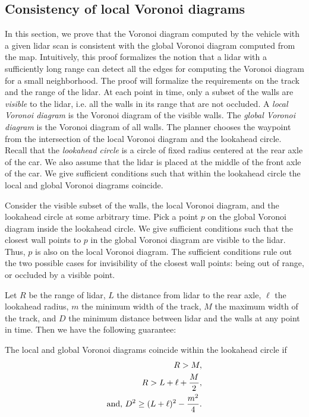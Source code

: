 \subsection{Consistency of local Voronoi diagrams}
\label{sec:localVoronoi}

In this section, we prove that the Voronoi diagram computed by the vehicle with a given lidar scan is consistent with the global Voronoi diagram computed from the map.
%
Intuitively, this proof formalizes the notion that a lidar with a sufficiently long range can detect all the edges for computing the Voronoi diagram for a small neighborhood.
%
The proof will formalize the requirements on the track and the range of the lidar.
%
At each point in time, only a subset of the walls are \emph{visible} to the lidar, i.e. all the walls in its range that are not occluded.
%
A \emph{local Voronoi diagram} is the Voronoi diagram of the visible walls.
%
The \emph{global Voronoi diagram} is the Voronoi diagram of all walls.
%
The planner chooses the waypoint from the intersection of the local Voronoi diagram and the lookahead circle.
%
Recall that the \emph{lookahead circle} is a circle of fixed radius centered at the rear axle of the car.
%
We also assume that the lidar is placed at the middle of the front axle of the car.
%
We give sufficient conditions such that within the lookahead circle the local and global Voronoi diagrams coincide.
%

Consider the visible subset of the walls, the local Voronoi diagram, and the lookahead circle at some arbitrary time.
%
Pick a point $p$ on the global Voronoi diagram inside the lookahead circle.
%
We give sufficient conditions such that the closest wall points to $p$ in the global Voronoi diagram are visible to the lidar. 
%
Thus, $p$ is also on the local Voronoi diagram.
%
The sufficient conditions rule out the two possible cases for invisibility of the closest wall points: being out of range, or occluded by a visible point.

Let $R$ be the range of lidar, 
$L$ the distance from lidar to the rear axle,
$\ell$ the lookahead radius,
$m$ the minimum width of the track,
$M$ the maximum width of the track,
and $D$ the minimum distance between lidar and the walls at any point in time.
Then we have the following guarantee:

\begin{theorem}
The local and global Voronoi diagrams coincide within the lookahead circle if
\begin{align}
    R > M, \\
    R > L + \ell + \frac{M}{2}, \label{eq:lidar-range-b} \\
    \textnormal{and,  } D^2 \geq (L+\ell)^2-\frac{m^2}{4}.\label{eq:lidar-wall-distance}
\end{align}
\label{thm:voronoi}
\end{theorem}

